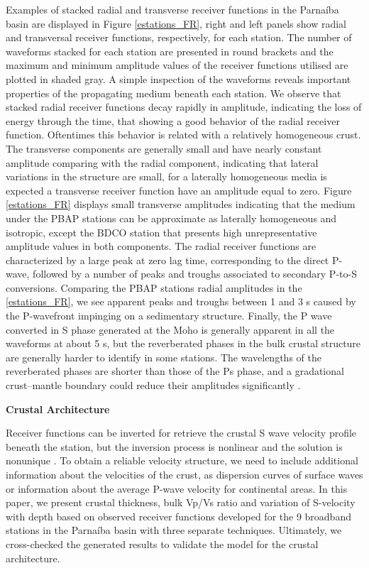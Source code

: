 \documentclass[paper,11pt]{geophysics}
\begin{document}
Examples of stacked radial and transverse receiver functions in the Parnaíba basin are displayed in Figure \ref{estations_FR}, right and left panels show radial and transversal receiver functions, respectively, for each station. The number of waveforms stacked for each station are presented in round brackets and the maximum and minimum amplitude values of the receiver functions utilised are plotted in shaded gray. A simple inspection of the waveforms reveals important properties of the propagating medium beneath each station. We observe that stacked radial receiver functions decay rapidly in amplitude, indicating the loss of energy through the time, that showing a good behavior of the radial receiver function. Oftentimes this behavior is related with a relatively homogeneous crust. The transverse components are generally small and have nearly constant amplitude comparing with the radial component, indicating that lateral variations in the structure are small, for a laterally homogeneous media is expected a transverse receiver function have an amplitude equal to zero. Figure \ref{estations_FR} displays small transverse amplitudes indicating that the medium under the PBAP stations can be approximate as laterally homogeneous and isotropic, except the BDCO station that presents high unrepresentative amplitude values in both components. The radial receiver functions are characterized by a large peak at zero lag time, corresponding to the direct P-wave, followed by a number of peaks and troughs associated to secondary P-to-S conversions. Comparing the PBAP stations radial amplitudes in the \ref{estations_FR}, we see apparent peaks and troughs between 1 and 3 s caused by the P-wavefront impinging on a sedimentary structure. Finally, the P wave converted in S phase generated at the Moho is generally apparent in all the waveforms at about 5 s, but the reverberated phases in the bulk crustal structure are generally harder to identify in some stations. The wavelengths of the reverberated phases are shorter than those of the Ps phase, and a gradational crust–mantle boundary could reduce their amplitudes significantly \citep{julia_joint_2000}.
\linebreak
\linebreak

\begin{flushleft}
\textbf{\LARGE Crustal Architecture}
\end{flushleft}

Receiver functions can be inverted for retrieve the crustal S wave velocity profile beneath the station, but  the inversion process is nonlinear and the solution is nonunique \citep{ammon_nonuniqueness_1990}. To obtain a reliable velocity structure, we need to include additional information about the velocities of the crust, as dispersion curves of surface waves or information about the average P-wave velocity for continental areas. In this paper, we present crustal thickness, bulk Vp/Vs ratio and variation of S-velocity with depth based on observed receiver functions developed for the 9 broadband stations in the Parnaíba basin with three separate techniques. Ultimately, we cross-checked the generated results to validate the model for the crustal architecture.
\linebreak
\end{document}
